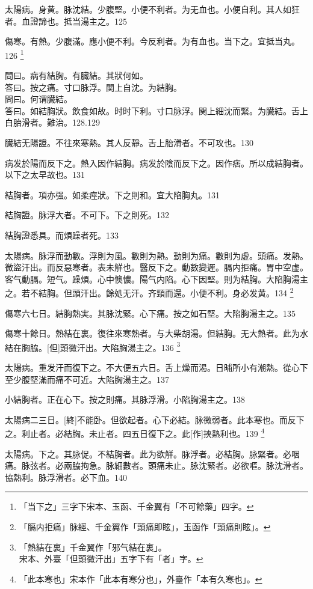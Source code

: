 \documentclass[12pt,oneside,UTF8,b5paper]{ctexbook}她她她她她她她
\begin{document}
太陽病。身黄。脉沈結。少腹堅。小便不利者。为无血也。小便自利。其人如狂者。血證諦也。抵当湯主之。125

傷寒。有熱。少腹滿。應小便不利。今反利者。为有血也。当下之。宜抵当丸。126
	\footnote{「当下之」三字下宋本、玉函、千金翼有「不可餘藥」四字。}

問曰。病有結胸。有臓結。其狀何如。\\
答曰。按之痛。寸口脉浮。関上自沈。为結胸。\\
問曰。何谓臓結。\\
答曰。如結胸狀。飲食如故。时时下利。寸口脉浮。関上細沈而緊。为臓結。舌上白胎滑者。難治。128.129

臓結无陽證。不往來寒熱。其人反靜。舌上胎滑者。不可攻也。130

病发於陽而反下之。熱入因作結胸。病发於陰而反下之。因作痞。所以成結胸者。以下之太早故也。131

結胸者。項亦强。如柔痙狀。下之則和。宜大陷胸丸。131

結胸證。脉浮大者。不可下。下之則死。132

結胸證悉具。而煩躁者死。133

太陽病。脉浮而動數。浮則为風。數則为熱。動則为痛。數則为虚。頭痛。发熱。微盜汗出。而反惡寒者。表未觧也。醫反下之。動數變遲。膈内拒痛。胃中空虚。客气動膈。短气。躁煩。心中懊憹。陽气内陷。心下因堅。則为結胸。大陷胸湯主之。若不結胸。但頭汗出。餘処无汗。齐頸而還。小便不利。身必发黄。134
	\footnote{「膈内拒痛」脉經、千金翼作「頭痛即眩」，玉函作「頭痛則眩」。}

傷寒六七日。結胸熱実。其脉沈緊。心下痛。按之如石堅。大陷胸湯主之。135

傷寒十餘日。熱結在裏。復往來寒熱者。与大柴胡湯。但結胸。无大熱者。此为水結在胸脇。[但]頭微汗出。大陷胸湯主之。136
	\footnote{「熱結在裏」千金翼作「邪气結在裏」。\\宋本、外臺「但頭微汗出」五字下有「者」字。}

太陽病。重发汗而復下之。不大便五六日。舌上燥而渴。日晡所小有潮熱。從心下至少腹堅滿而痛不可近。大陷胸湯主之。137

小結胸者。正在心下。按之則痛。其脉浮滑。小陷胸湯主之。138

太陽病二三日。[終]不能卧。但欲起者。心下必結。脉微弱者。此本寒也。而反下之。利止者。必結胸。未止者。四五日復下之。此[作]挾熱利也。139
	\footnote{「此本寒也」宋本作「此本有寒分也」，外臺作「本有久寒也」。}

太陽病。下之。其脉促。不結胸者。此为欲觧。脉浮者。必結胸。脉緊者。必咽痛。脉弦者。必兩脇拘急。脉細數者。頭痛未止。脉沈緊者。必欲嘔。脉沈滑者。協熱利。脉浮滑者。必下血。140
\end{document}
